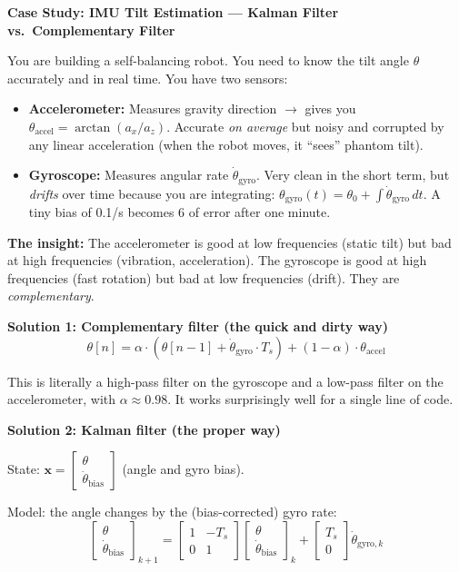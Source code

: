 \vspace{0.5em}
\begin{mdframed}[linewidth=1pt, innertopmargin=10pt, innerbottommargin=10pt]
\textbf{Case Study: IMU Tilt Estimation --- Kalman Filter vs.\ Complementary Filter}

\vspace{0.3em}
You are building a self-balancing robot. You need to know the tilt angle $\theta$ accurately and in real time. You have two sensors:

\begin{itemize}[nosep]
    \item \textbf{Accelerometer:} Measures gravity direction $\to$ gives you $\theta_{\text{accel}} = \arctan(a_x / a_z)$. Accurate \textit{on average} but noisy and corrupted by any linear acceleration (when the robot moves, it ``sees'' phantom tilt).
    \item \textbf{Gyroscope:} Measures angular rate $\dot{\theta}_{\text{gyro}}$. Very clean in the short term, but \textit{drifts} over time because you are integrating: $\theta_{\text{gyro}}(t) = \theta_0 + \int \dot{\theta}_{\text{gyro}} \, dt$. A tiny bias of 0.1\textdegree/s becomes 6\textdegree{} of error after one minute.
\end{itemize}

\textbf{The insight:} The accelerometer is good at low frequencies (static tilt) but bad at high frequencies (vibration, acceleration). The gyroscope is good at high frequencies (fast rotation) but bad at low frequencies (drift). They are \textit{complementary}.

\textbf{Solution 1: Complementary filter (the quick and dirty way)}
\[
\theta[n] = \alpha \cdot (\theta[n-1] + \dot{\theta}_{\text{gyro}} \cdot T_s) + (1 - \alpha) \cdot \theta_{\text{accel}}
\]

This is literally a high-pass filter on the gyroscope and a low-pass filter on the accelerometer, with $\alpha \approx 0.98$. It works surprisingly well for a single line of code.

\textbf{Solution 2: Kalman filter (the proper way)}

State: $\mathbf{x} = \begin{bmatrix} \theta \\ \dot{\theta}_{\text{bias}} \end{bmatrix}$ (angle and gyro bias).

Model: the angle changes by the (bias-corrected) gyro rate:
\[
\begin{bmatrix} \theta \\ \dot{\theta}_{\text{bias}} \end{bmatrix}_{k+1} =
\begin{bmatrix} 1 & -T_s \\ 0 & 1 \end{bmatrix}
\begin{bmatrix} \theta \\ \dot{\theta}_{\text{bias}} \end{bmatrix}_k +
\begin{bmatrix} T_s \\ 0 \end{bmatrix} \dot{\theta}_{\text{gyro},k}
\]


\end{mdframed}
